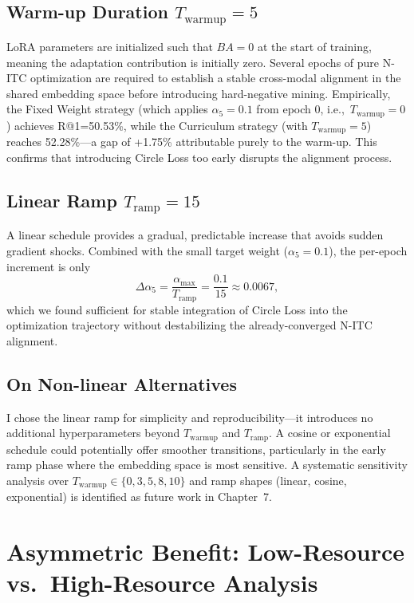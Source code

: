 \documentclass[../main.tex]{subfiles}
\begin{document}
\subsection*{Warm-up Duration $T_{\text{warmup}}{=}5$}

LoRA parameters are initialized such that $BA{=}0$ at the start of training, meaning the adaptation contribution is initially zero. Several epochs of pure N-ITC optimization are required to establish a stable cross-modal alignment in the shared embedding space before introducing hard-negative mining. Empirically, the Fixed Weight strategy (which applies $\alpha_5{=}0.1$ from epoch 0, i.e.,\ $T_{\text{warmup}}{=}0$) achieves R@1=50.53\%, while the Curriculum strategy (with $T_{\text{warmup}}{=}5$) reaches 52.28\%---a gap of +1.75\% attributable purely to the warm-up. This confirms that introducing Circle Loss too early disrupts the alignment process.

\subsection*{Linear Ramp $T_{\text{ramp}}{=}15$}

A linear schedule provides a gradual, predictable increase that avoids sudden gradient shocks. Combined with the small target weight ($\alpha_5{=}0.1$), the per-epoch increment is only
\[
\Delta \alpha_5 = \frac{\alpha_{\max}}{T_{\text{ramp}}} = \frac{0.1}{15} \approx 0.0067,
\]
which we found sufficient for stable integration of Circle Loss into the optimization trajectory without destabilizing the already-converged N-ITC alignment.

\subsection*{On Non-linear Alternatives}

I chose the linear ramp for simplicity and reproducibility---it introduces no additional hyperparameters beyond $T_{\text{warmup}}$ and $T_{\text{ramp}}$. A cosine or exponential schedule could potentially offer smoother transitions, particularly in the early ramp phase where the embedding space is most sensitive. A systematic sensitivity analysis over $T_{\text{warmup}} \in \{0, 3, 5, 8, 10\}$ and ramp shapes (linear, cosine, exponential) is identified as future work in Chapter~7.

\section{Asymmetric Benefit: Low-Resource vs.\ High-Resource Analysis}
\label{sec:asymmetric_benefit}
\end{document}
